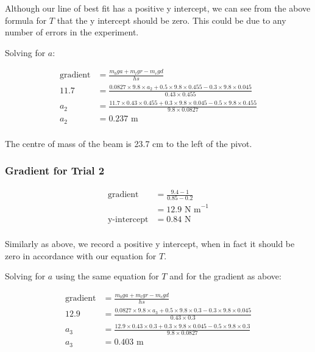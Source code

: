 \documentclass[a4paper,11pt]{article}
\begin{document}
Although our line of best fit has a positive y intercept, we can see from the
above formula for $T$ that the y intercept should be zero. This could be due to
any number of errors in the experiment.

Solving for $a$:

$$
\begin{aligned}
\mbox{gradient} & = \frac{m_b g a + m_l g r - m_c g d}{h s} \\
11.7 & = \frac{0.0827 \times 9.8 \times a_2 + 0.5 \times 9.8 \times 0.455 - 0.3 \times 9.8 \times 0.045}{0.43 \times 0.455} \\
a_2 & = \frac{11.7 \times 0.43 \times 0.455 + 0.3 \times 9.8 \times 0.045 - 0.5 \times 9.8 \times 0.455}{9.8 \times 0.0827} \\
a_2 & = 0.237\mbox{ m} \\
\end{aligned}
$$

The centre of mass of the beam is 23.7 cm to the left of the pivot.


\subsubsection{Gradient for Trial 2}

$$
\begin{aligned}
\mbox{gradient} & = \frac{9.4 - 1}{0.85 - 0.2} \\
& = 12.9\mbox{ N m}^{-1} \\
\mbox{y-intercept} & = 0.84\mbox{ N} \\
\end{aligned}
$$

Similarly as above, we record a positive y intercept, when in fact it should be
zero in accordance with our equation for $T$.

Solving for $a$ using the same equation for $T$ and for the gradient as above:

$$
\begin{aligned}
\mbox{gradient} & = \frac{m_b g a + m_l g r - m_c g d}{h s} \\
12.9 & = \frac{0.0827 \times 9.8 \times a_3 + 0.5 \times 9.8 \times 0.3 - 0.3 \times 9.8 \times 0.045}{0.43 \times 0.3} \\
a_3 & = \frac{12.9 \times 0.43 \times 0.3 + 0.3 \times 9.8 \times 0.045 - 0.5 \times 9.8 \times 0.3}{9.8 \times 0.0827} \\
a_3 & = 0.403\mbox{ m} \\
\end{aligned}
$$
\end{document}

